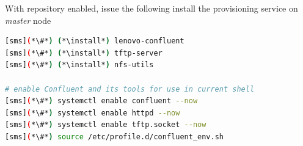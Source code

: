 With \Confluent{} repository enabled, issue the following install the provisioning
service on {\em master} node

\begin{lstlisting}[language=bash,keywords={}]
[sms](*\#*) (*\install*) lenovo-confluent
[sms](*\#*) (*\install*) tftp-server
[sms](*\#*) (*\install*) nfs-utils

# enable Confluent and its tools for use in current shell
[sms](*\#*) systemctl enable confluent --now
[sms](*\#*) systemctl enable httpd --now
[sms](*\#*) systemctl enable tftp.socket --now
[sms](*\#*) source /etc/profile.d/confluent_env.sh
\end{lstlisting}
